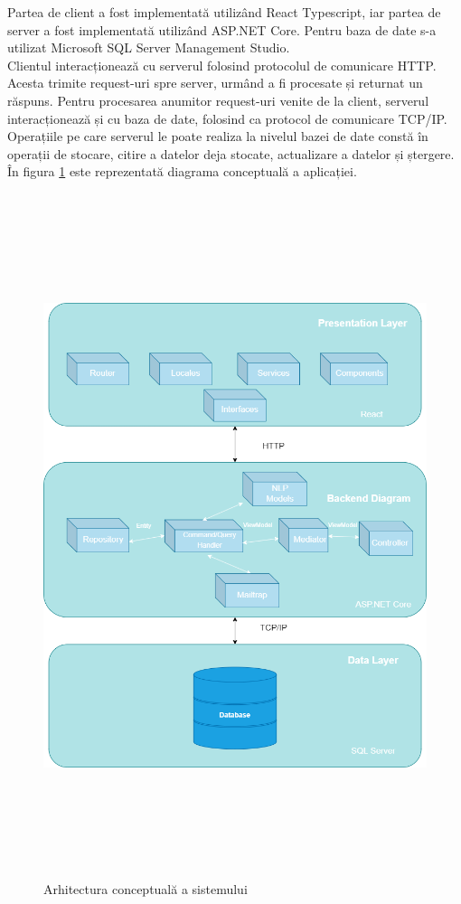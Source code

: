 Partea de client a fost implementată utilizând React Typescript, iar partea de server a fost implementată utilizând ASP.NET Core. Pentru baza de date s-a utilizat Microsoft SQL Server Management Studio.\\

Clientul interacționează cu serverul folosind protocolul de comunicare HTTP. Acesta trimite request-uri spre server, urmând a fi procesate și returnat un răspuns. Pentru procesarea anumitor request-uri venite de la client,
serverul interacționează și cu baza de date, folosind ca protocol de comunicare TCP/IP. \\
Operațiile pe care serverul le poate realiza la nivelul bazei de date constă în operații de stocare, citire a datelor deja stocate, actualizare a datelor și ștergere. \\

\noindent În figura \ref{fig:conceptualArchitecture} este reprezentată diagrama conceptuală a aplicației.
\begin{figure}[H]
	\centering
	\includegraphics[height=200mm]{figs/conceptualArchitecture.png}
	\caption{Arhitectura conceptuală a sistemului}
	\label{fig:conceptualArchitecture}
\end{figure}
\newpage

